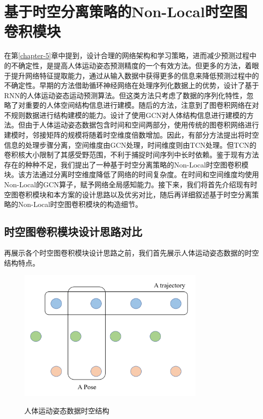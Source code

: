 \chapter{基于时空分离策略的Non-Local时空图卷积模块}
在第\ref{chapter-5}章中提到，设计合理的网络架构和学习策略，进而减少预测过程中的不确定性，是提高人体运动姿态预测精度的一个有效方法。但更多的方法，着眼于提升网络特征提取能力，通过从输入数据中获得更多的信息来降低预测过程中的不确定性。早期的方法借助循环神经网络在处理序列化数据上的优势，设计了基于RNN的人体运动姿态运动预测算法。但这类方法只考虑了数据的序列化特性，忽略了对重要的人体空间结构信息进行建模。随后的方法，注意到了图卷积网络在对不规则数据进行结构建模的能力。设计了使用GCN对人体结构信息进行建模的方法。但由于人体运动姿态数据包含时间和空间两部分，使用传统的图卷积网络进行建模时，邻接矩阵的规模将随着时空维度倍数增加。因此，有部分方法提出将时空信息的处理步骤分离，空间维度由GCN处理，时间维度则由TCN\cite{oord2016wavenet}处理。但TCN的卷积核大小限制了其感受野范围，不利于捕捉时间序列中长时依赖。鉴于现有方法存在的种种不足，我们提出了一种基于时空分离策略的Non-Local时空图卷积模块。该方法通过分离时空维度降低了网络的时间复杂度。在时间和空间维度均使用Non-Local的GCN算子，赋予网络全局感知能力。接下来，我们将首先介绍现有时空图卷积模块和本方案的设计思路以及优劣对比，随后再详细叙述基于时空分离策略的Non-Local时空图卷积模块的构造细节。

\section{时空图卷积模块设计思路对比}
再展示各个时空图卷积模块设计思路之前，我们首先展示人体运动姿态数据的时空结构特点。

\begin{figure}[ht]
    \centering
    \includegraphics[width=0.80\textwidth]{FigMa/human_pose_seq.png}\\
    \vspace{-0.3cm}
    \caption{人体运动姿态数据时空结构}
    \label{fig:human_pose_seq_structure}
\end{figure}

